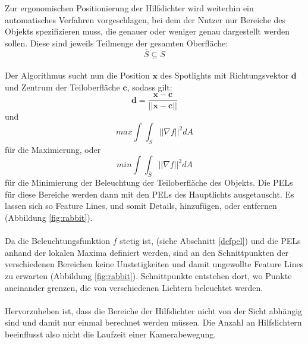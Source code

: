 \documentclass{paperStyle}
\begin{document}
Zur ergonomischen Positionierung der Hilfslichter wird weiterhin ein automatisches Verfahren vorgeschlagen, bei dem der Nutzer nur Bereiche des Objekts spezifizieren muss, die genauer oder weniger genau dargestellt werden sollen. Diese sind jeweils Teilmenge der gesamten Oberfläche:
\begin{equation}
\bar{S} \subseteq S
\label{eq:ssubsets}
\end{equation}
\\
Der Algorithmus sucht nun die Position $\mathbf{x}$ des Spotlights mit Richtungsvektor $\mathbf{d}$ und Zentrum der Teiloberfläche $\mathbf{c}$, sodass gilt:
\begin{equation}
\mathbf{d} = \frac{\mathbf{x} - \mathbf{c}}{||\mathbf{x} - \mathbf{c}||}
\end{equation}
und
\begin{equation}
max \int_{}\int_{\bar{S}} || \nabla f||^{2} dA
\end{equation}
für die Maximierung, oder
\begin{equation}
min \int_{}\int_{\bar{S}} || \nabla f||^{2} dA
\end{equation}
für die Minimierung der Beleuchtung der Teiloberfläche des Objekts. Die PELs für diese Bereiche werden dann mit den PELs des Hauptlichts ausgetauscht.
Es lassen sich so Feature Lines, und somit Details, hinzufügen, oder entfernen (Abbildung \ref{fig:rabbit}).
\\\\
Da die Beleuchtungsfunktion $f$ stetig ist, (siehe Abschnitt \ref{defpel}) und die PELs anhand der lokalen Maxima definiert werden,
sind an den Schnittpunkten der verschiedenen Bereichen keine Unstetigkeiten und damit ungewollte Feature Lines zu erwarten (Abbildung \ref{fig:rabbit}). Schnittpunkte entstehen dort, wo Punkte aneinander grenzen, die von verschiedenen Lichtern beleuchtet werden.
\\\\
Hervorzuheben ist, dass die Bereiche der Hilfslichter nicht von der Sicht abhängig sind und damit nur einmal berechnet werden müssen. Die Anzahl an Hilfslichtern beeinflusst also  nicht die Laufzeit einer Kamerabewegung.
\end{document}
